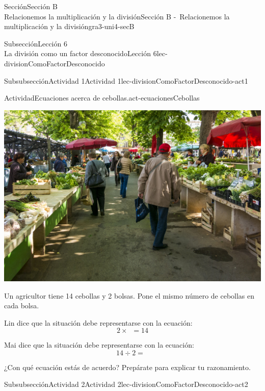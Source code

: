\begin{sectionptx}{Sección}{{\Large Sección B\\}Relacionemos la multiplicación y la división}{}{Sección B -~Relacionemos la multiplicación y la división}{}{}{gra3-uni4-secB}
\begin{subsectionptx}{Subsección}{{\normalsize Lección 6\\[-0.05cm]}La división como un factor desconocido}{}{Lección 6}{}{}{lec-divisionComoFactorDesconocido}
%
%
\typeout{************************************************}
\typeout{************************************************}
%
\vspace*{-1.5ex}
\begin{subsubsectionptx}{Subsubsección}{Actividad 1}{}{Actividad 1}{}{}{lec-divisionComoFactorDesconocido-act1}
\begin{activity}{Actividad}{Ecuaciones acerca de cebollas.}{act-ecuacionesCebollas}%
\begin{image}{0.15}{0.7}{0.15}{}%
\includegraphics[width=0.5\linewidth, max width=\linewidth, center]{external/jpg-source/3.4.B6 Act 1 Launch.jpg}
\end{image}%
Un agricultor tiene 14 cebollas y 2 bolsas. Pone el mismo número de cebollas en cada bolsa.%
\par
Lin dice que la situación debe representarse con la ecuación:%
\begin{equation*}
2 \times \boxed{\phantom{3}} = 14
\end{equation*}
%
\par
Mai dice que la situación debe representarse con la ecuación:%
\begin{equation*}
14 \div 2 = \boxed{\phantom{3}}
\end{equation*}
%
\par
¿Con qué ecuación estás de acuerdo? Prepárate para explicar tu razonamiento.%
\end{activity}%
\end{subsubsectionptx}
%
%
\typeout{************************************************}
\typeout{************************************************}
%
\begin{subsubsectionptx}{Subsubsección}{Actividad 2}{}{Actividad 2}{}{}{lec-divisionComoFactorDesconocido-act2}

\end{subsubsectionptx}
\end{subsectionptx}
\end{sectionptx}
